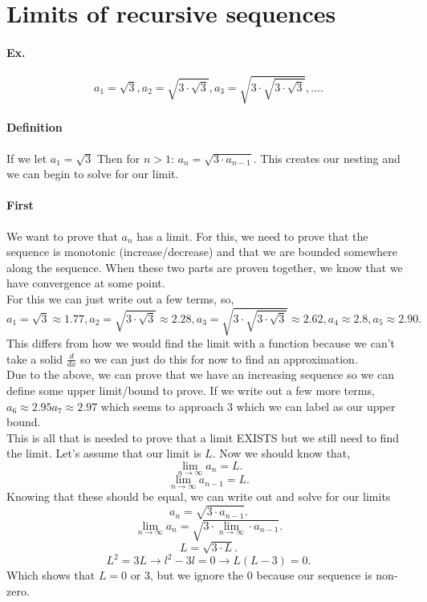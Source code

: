 
\section{Limits of recursive sequences}%
\label{sec:Limits of recursive sequences}

\paragraph{Ex.}%
\label{par:Ex.}

\[
a_1 = \sqrt{ 3}, a_2 = \sqrt{ 3 \cdot \sqrt{ 3}}, a_3 = \sqrt{ 3 \cdot \sqrt{ 3 \cdot \sqrt{ 3}}}, \ldots
.\] 

\paragraph{Definition\\}

If we let $ a_1 = \sqrt{ 3} $ Then for $ n>1 $: $ a_n = \sqrt{ 3\cdot a_{ n-1 }} $.
This creates our nesting and we can begin to solve for our limit. 

\paragraph{First \\}
We want to prove that $ a_n $ has a limit. For this, we need to prove that the sequence is monotonic (increase/decrease) and that we are bounded somewhere along the sequence. When these two parts are proven together, we know that we have convergence at some point. \\

For this we can just write out a few terms, so,
\[
a_1 = \sqrt{ 3} \approx 1.77, a_2 = \sqrt{ 3\cdot \sqrt{ 3}} \approx 2.28, a_3 = \sqrt{ 3\cdot \sqrt{ 3\cdot \sqrt{ 3}}} \approx 2.62, a_{ 4 } \approx 2.8 , a_{ 5 } \approx 2.90
.\] 
This differs from how we would find the limit with a function because we can't take a solid $ \frac{ d }{ dx }  $ so we can just do this for now to find an approximation.\\

Due to the above, we can prove that we have an increasing sequence so we can define some upper limit/bound to prove. If we write out a few more terms, $ a_6 \approx 2.95 a_7 \approx 2.97 $ which seems to approach 3 which we can label as our upper bound. \\

This is all that is needed to prove that a limit EXISTS but we still need to find the limit. Let's assume that our limit is $ L $. Now we should know that,
\[
\lim_{ n \to \infty} a_n = L
.\] 
\[
\lim_{ n \to \infty} a_{ n-1 }= L 
.\] 
\newpage
Knowing that these should be equal, we can write out and solve for our limits
\[
a_n = \sqrt{ 3\cdot a_{ n-1 }}
.\] 
\[
\lim_{ n \to \infty} a_n = \sqrt{ 3\cdot \lim_{ n \to \infty} \cdot a_{ n-1 }}
.\] 
\[
L = \sqrt{ 3\cdot L}
.\] 
\[
L^2=3L \to l^2-3l = 0 \to L(L-3) = 0
.\] 
Which shows that $ L = 0 \text{ or }3 $, but we ignore the 0 because our sequence is non-zero. 


